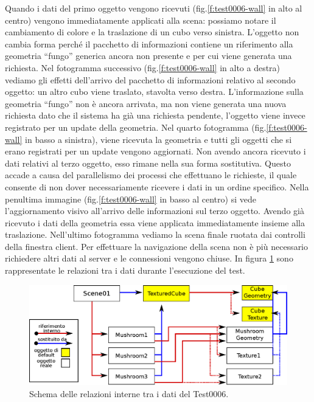 Quando i dati del primo oggetto vengono ricevuti (fig.\ref{f:test0006-wall} in alto al centro) vengono immediatamente applicati alla scena: possiamo notare il cambiamento di colore e la traslazione di un cubo verso sinistra. 
L'oggetto non cambia forma perch\'e il pacchetto di informazioni contiene un riferimento alla geometria ``fungo'' generica ancora non presente e per cui viene generata una richiesta. 
Nel fotogramma successivo (fig.\ref{f:test0006-wall} in alto a destra) vediamo gli effetti dell'arrivo del pacchetto di informazioni relativo al secondo oggetto: un altro cubo viene traslato, stavolta verso destra. 
L'informazione sulla geometria ``fungo'' non \`e ancora arrivata, ma non viene generata una nuova richiesta dato che il sistema ha gi\`a una richiesta pendente, l'oggetto viene invece registrato per un update della geometria.
Nel quarto fotogramma (fig.\ref{f:test0006-wall} in basso a sinistra), viene ricevuta la geometria e tutti gli oggetti che si erano registrati per un update vengono aggiornati. Non avendo ancora ricevuto i dati relativi al terzo oggetto, esso rimane nella sua forma sostitutiva. Questo accade a causa del parallelismo dei processi che effettuano le richieste, il quale consente di non dover necessariamente ricevere i dati in un ordine specifico.
Nella penultima immagine (fig.\ref{f:test0006-wall} in basso al centro) si vede l'aggiornamento visivo all'arrivo delle informazioni sul terzo oggetto. Avendo gi\`a ricevuto i dati della geometria essa viene applicata immediatamente insieme alla traslazione. Nell'ultimo fotogramma vediamo la scena finale ruotata dai controlli della finestra client. Per effettuare la navigazione della scena non \`e pi\`u necessario richiedere altri dati al server e le connessioni vengono chiuse. In figura \ref{f:schemadati} sono rappresentate le relazioni tra i dati durante l'esecuzione del test.
\begin{figure}
\begin{center}
\includegraphics[width=\textwidth]{Immagini/schemadati}
\caption{Schema delle relazioni interne tra i dati del Test0006.\label{f:schemadati}} 
\end{center} 
\end{figure}

